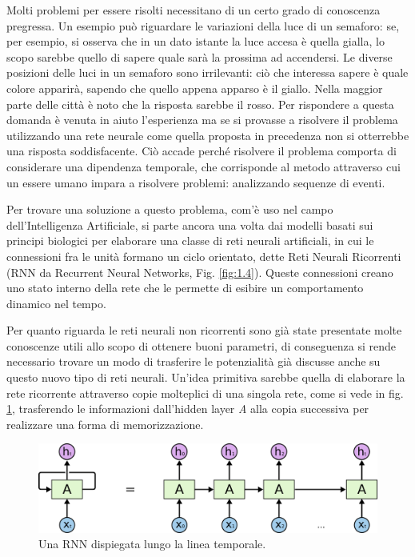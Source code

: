 Molti problemi per essere risolti necessitano di un certo grado di conoscenza pregressa. Un esempio può riguardare le variazioni della luce di un semaforo: se, per esempio, si osserva che in un dato istante la luce accesa è quella gialla, lo scopo sarebbe quello di sapere quale sarà la prossima ad accendersi. Le diverse posizioni delle luci in un semaforo sono irrilevanti: ciò che interessa sapere è quale colore apparirà, sapendo che quello appena apparso è il giallo. Nella maggior parte delle città è noto che la risposta sarebbe il rosso. Per rispondere a questa domanda è venuta in aiuto l'esperienza ma se si provasse a risolvere il problema utilizzando una rete neurale come quella proposta in precedenza non si otterrebbe una risposta soddisfacente. Ciò accade perché risolvere il problema comporta di considerare una dipendenza temporale, che corrisponde al metodo attraverso cui un essere umano impara a risolvere problemi: analizzando sequenze di eventi.

Per trovare una soluzione a questo problema, com'è uso nel campo dell'Intelligenza Artificiale, si parte ancora una volta dai modelli basati sui principi biologici per elaborare una classe di reti neurali artificiali, in cui le connessioni fra le unità formano un ciclo orientato, dette Reti Neurali Ricorrenti (RNN da Recurrent Neural Networks, Fig. \ref{fig:1.4}). Queste connessioni creano uno stato interno della rete che le permette di esibire un comportamento dinamico nel tempo.

Per quanto riguarda le reti neurali non ricorrenti sono già state presentate molte conoscenze utili allo scopo di ottenere buoni parametri, di conseguenza si rende necessario trovare un modo di trasferire le potenzialità già discusse anche su questo nuovo tipo di reti neurali. Un'idea primitiva sarebbe quella di elaborare la rete ricorrente attraverso copie molteplici di una singola rete, come si vede in fig. \ref{fig:1.5}, trasferendo le informazioni dall'hidden layer \textit{A} alla copia successiva per realizzare una forma di memorizzazione.

\begin{figure}[ht]
	\centering
	\includegraphics{img/unrolled_rnn.png}
	\caption{Una RNN dispiegata lungo la linea temporale.}
	\label{fig:1.5}
\end{figure}

